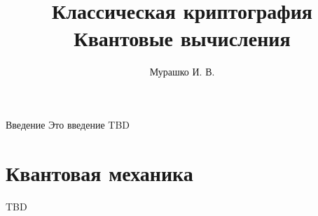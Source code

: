 \documentclass[10pt,pdf,hyperref={unicode}]{beamer}
\title[Криптография и квантовые вычисления]{Классическая
  криптография\\Квантовые вычисления}
\author{Мурашко И. В.}
\institute{Санкт Петербургский Государственный Политехнический Университет}
\date{}
\begin{document}
\begin{frame}
\titlepage
\end{frame}


\begin{frame}{Введение}
Это введение TBD
\end{frame}



\section{Квантовая механика}
\begin{frame}
TBD
\end{frame}


\end{document}
